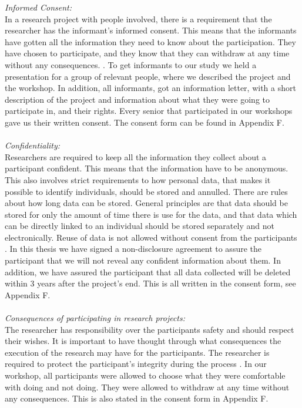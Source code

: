 \emph{Informed Consent:} \\
In a research project with people involved, there is a requirement that the researcher has the informant's informed consent. This means that the informants have gotten all the information they need to know about the participation. They have chosen to participate, and they know that they can withdraw at any time without any consequences.  \cite{qualitative}. To get informants to our study we held a presentation for a group of relevant people, where we described the project and the workshop. In addition, all informants, got an information letter, with a short description of the project and information about what they were going to participate in, and their rights. Every senior that participated in our workshops gave us their written consent. The consent form can be found in Appendix F.   \\ \\
\emph{Confidentiality:}\\
Researchers are required to keep all the information they collect about a participant confident. This means that the information have to be anonymous. This also involves strict requirements to how personal data, that makes it possible to identify individuals, should be stored and annulled. There are rules about how long data can be stored. General principles are that data should be stored for only the amount of time there is use for the data, and that data which can be directly linked to an individual should be stored separately and not electronically.  Reuse of data is not allowed without consent from the participants \cite{qualitative}. In this thesis we have signed a non-disclosure agreement to assure the participant that we will not reveal any confident information about them. In addition, we have assured the participant that all data collected will be deleted within 3 years after the project's end. This is all written in the consent form, see Appendix F. \\ \\
\emph{Consequences of participating in research projects:}\\
The researcher has responsibility over the participants safety and should respect their wishes. It is important to have thought through what consequences the execution of the research may have for the participants. The researcher is required to protect the participant's integrity during the process \cite{qualitative}. In our workshop, all participants were allowed to choose what they were comfortable with doing and not doing. They were allowed to withdraw at any time without any consequences. This is also stated in the consent form in Appendix F. \\ \\

